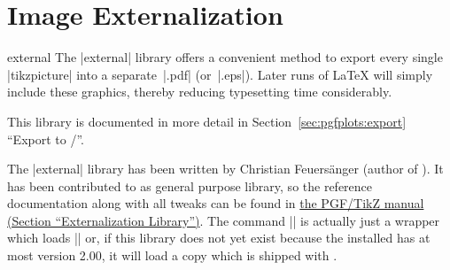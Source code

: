 
\section[libs.external]{Image Externalization}

\begingroup
\def\pgfplotsmanualcurlibrary{external}

\begin{pgfplotslibrary}{external}
    The |external| library offers a convenient method to export every single
    |tikzpicture| into a separate~|.pdf| (or~|.eps|). Later runs of \LaTeX{}
    will simply include these graphics, thereby reducing typesetting time
    considerably.

    This library is documented in more detail in
    Section~\ref{sec:pgfplots:export} ``Export to {\pdf/\eps}''.

    The |external| library has been written by Christian Feuersänger (author
    of \PGFPlots). It has been contributed to \Tikz{} as general purpose
    library, so the reference documentation along with all tweaks can be found
    in \href{https://tikz.dev/library-external}{the PGF/TikZ manual (Section ``Externalization Library'')}. The command
    || is actually just a wrapper which loads
    |\usetikzlibrary{external}| or, if this library does not yet exist because
    the installed \pgfname{} has at most version 2.00, it will load a copy
    which is shipped with \PGFPlots{}.
\end{pgfplotslibrary}
\endgroup
